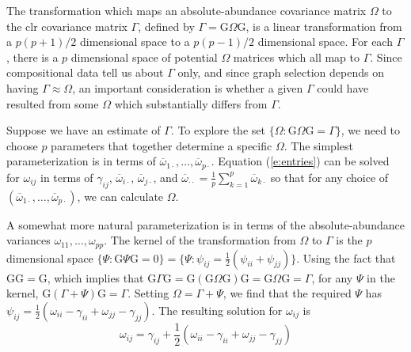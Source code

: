 \documentclass[10pt]{article}
\begin{document}
The transformation which maps an absolute-abundance covariance matrix $\Omega$ to the clr covariance matrix $\Gamma$, defined by $\Gamma = \mathrm{G} \Omega \mathrm{G}$, is a linear transformation from a $p(p+1)/2$ dimensional space to a $p(p-1)/2$ dimensional space. For each $\Gamma$, there is a $p$ dimensional space of potential $\Omega$ matrices which all map to $\Gamma$. Since compositional data tell us about $\Gamma$ only, and since graph selection depends on having $\Gamma \approx \Omega$, an important consideration is whether a given $\Gamma$ could have resulted from some $\Omega$ which substantially differs from $\Gamma$.

Suppose we have an estimate of $\Gamma$. To explore the set $\{\Omega: \mathrm{G} \Omega \mathrm{G} = \Gamma\}$, we need to choose $p$ parameters that together determine a specific $\Omega$. The simplest parameterization is in terms of $\overline{\omega}_{1\cdot}, \dots, \overline{\omega}_{p\cdot}$. Equation (\ref{e:entries}) can be solved for $\omega_{ij}$ in terms of $\gamma_{ij}$, $\overline{\omega}_{i\cdot}$, $\overline{\omega}_{j\cdot}$, and $\overline{\omega}_{\cdot\cdot} = \frac{1}{p}\sum_{k=1}^p \overline{\omega}_{k\cdot}$ so that for any choice of $(\overline{\omega}_{1\cdot}, \dots, \overline{\omega}_{p\cdot})$, we can calculate $\Omega$.

A somewhat more natural parameterization is in terms of the absolute-abundance variances $\omega_{11}, \dots, \omega_{pp}$. The kernel of the transformation from $\Omega$ to $\Gamma$ is the $p$ dimensional space $\{ \Psi: \mathrm{G} \Psi \mathrm{G} = 0 \} = \{ \Psi: \psi_{ij} = \frac{1}{2}(\psi_{ii} + \psi_{jj})\}$. Using the fact that $\mathrm{G}\mathrm{G} = \mathrm{G}$, which implies that $\mathrm{G} \Gamma \mathrm{G} = \mathrm{G} (\mathrm{G} \Omega \mathrm{G}) \mathrm{G} = \mathrm{G} \Omega \mathrm{G} = \Gamma$, for any $\Psi$ in the kernel, $\mathrm{G} (\Gamma + \Psi) \mathrm{G} = \Gamma$. Setting $\Omega = \Gamma + \Psi$, we find that the required $\Psi$ has $\psi_{ij} = \frac{1}{2}(\omega_{ii} - \gamma_{ii} + \omega_{jj} - \gamma_{jj})$. The resulting solution for $\omega_{ij}$ is
\begin{equation}
\label{e:omegaentry}
\omega_{ij} = \gamma_{ij} + \frac{1}{2}(\omega_{ii} - \gamma_{ii} + \omega_{jj} - \gamma_{jj})
\end{equation}
\end{document}
